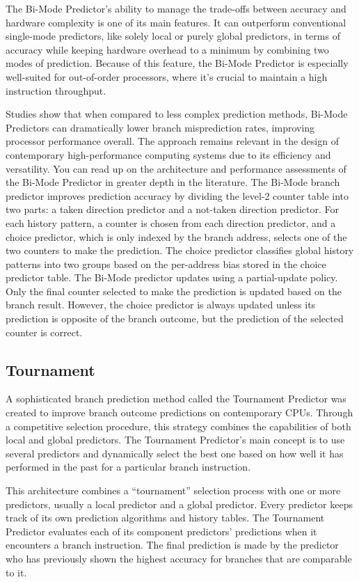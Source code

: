 \documentclass[10pt,journal,compsoc]{IEEEtran}
\begin{document}
The Bi-Mode Predictor's ability to manage the trade-offs between accuracy and hardware complexity is one of its main features. It can outperform conventional single-mode predictors, like solely local or purely global predictors, in terms of accuracy while keeping hardware overhead to a minimum by combining two modes of prediction. Because of this feature, the Bi-Mode Predictor is especially well-suited for out-of-order processors, where it's crucial to maintain a high instruction throughput.

Studies show that when compared to less complex prediction methods, Bi-Mode Predictors can dramatically lower branch misprediction rates, improving processor performance overall. The approach remains relevant in the design of contemporary high-performance computing systems due to its efficiency and versatility. You can read up on the architecture and performance assessments of the Bi-Mode Predictor in greater depth in the literature.
The Bi-Mode branch predictor improves prediction accuracy by dividing the level-2 counter table into two parts: a taken direction predictor and a not-taken direction predictor.
For each history pattern, a counter is chosen from each direction predictor, and a choice predictor, which is only indexed by the branch address, selects one of the two counters to make the prediction. The choice predictor classifies global history patterns into two groups based on the per-address bias stored in the choice predictor table.
The Bi-Mode predictor updates using a partial-update policy. Only the final counter selected to make the prediction is updated based on the branch result. However, the choice predictor is always updated unless its prediction is opposite of the branch outcome, but the prediction of the selected counter is correct.\cite{mittalSurveyTechniquesDynamic2018}
\subsection{Tournament} 
\noindent A sophisticated branch prediction method called the Tournament Predictor was created to improve branch outcome predictions on contemporary CPUs. Through a competitive selection procedure, this strategy combines the capabilities of both local and global predictors. The Tournament Predictor's main concept is to use several predictors and dynamically select the best one based on how well it has performed in the past for a particular branch instruction.

This architecture combines a ``tournament'' selection process with one or more predictors, usually a local predictor and a global predictor. Every predictor keeps track of its own prediction algorithms and history tables. The Tournament Predictor evaluates each of its component predictors' predictions when it encounters a branch instruction. The final prediction is made by the predictor who has previously shown the highest accuracy for branches that are comparable to it.
\end{document}
